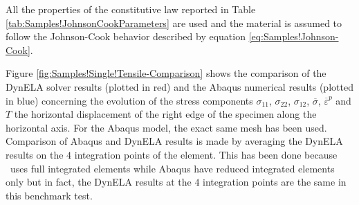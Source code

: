 All the properties of the constitutive law reported in Table \ref{tab:Samples!JohnsonCookParameters}
are used and the material is assumed to follow the Johnson-Cook behavior
described by equation \ref{eq:Samples!Johnson-Cook}.

Figure \ref{fig:Samples!Single!Tensile-Comparison} shows the comparison
of the DynELA solver results (plotted in red) and the Abaqus numerical
results (plotted in blue) concerning the evolution of the stress components
$\sigma_{11}$, $\sigma_{22}$, $\sigma_{12}$, $\overline{\sigma}$,
$\overline{\varepsilon}^{p}$ and $T$ \versus  the horizontal displacement
of the right edge of the specimen along the horizontal axis. For the
Abaqus model, the exact same mesh has been used. Comparison of Abaqus
and DynELA results is made by averaging the DynELA results on the
$4$ integration points of the element. This has been done because
\DynELA~uses full integrated elements while Abaqus have reduced
integrated elements only but in fact, the DynELA results at the $4$
integration points are the same in this benchmark test.

